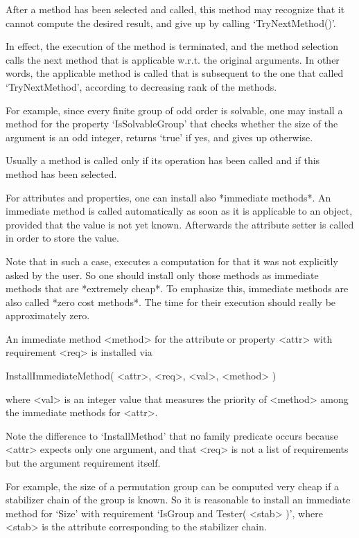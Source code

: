 
After a method has been selected and called,
this method may recognize that it cannot compute the desired result,
and give up by calling `TryNextMethod()'.

In effect, the execution of the method is terminated,
and the method selection calls the next method that is applicable w.r.t.
the original arguments.
In other words, the applicable method is called that is subsequent to the
one that called `TryNextMethod',
according to decreasing rank of the methods.

For example, since every finite group of odd order is solvable,
one may install a method for the property `IsSolvableGroup' that checks
whether the size of the argument is an odd integer,
returns `true' if yes,
and gives up otherwise.


Usually a method is called only if its operation has been called
and if this method has been selected.

For attributes and properties, one can install also *immediate methods*.
An immediate method is called automatically as soon as it is applicable
to an object, provided that the value is not yet known.
Afterwards the attribute setter is called in order to store the value.

Note that in such a case, {\GAP} executes a computation for that
it was not explicitly asked by the user.
So one should install only those methods as immediate methods
that are *extremely cheap*.
To emphasize this, immediate methods are also called *zero cost methods*.
The time for their execution should really be approximately zero.

An immediate method <method> for the attribute or property <attr>
with requirement <req> is installed via

\>InstallImmediateMethod( <attr>, <req>, <val>, <method> )

where <val> is an integer value that measures the priority of <method>
among the immediate methods for <attr>.

Note the difference to `InstallMethod' that no family predicate occurs
because <attr> expects only one argument,
and that <req> is not a list of requirements but the argument requirement
itself.

For example, the size of a permutation group can be computed very cheap
if a stabilizer chain of the group is known.
So it is reasonable to install an immediate method for `Size' with
requirement `IsGroup and Tester( <stab> )',
where <stab> is the attribute corresponding to the stabilizer chain.


